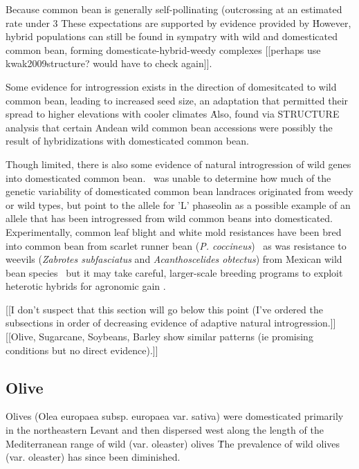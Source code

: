 \documentclass[11pt]{article}
\begin{document}
Because common bean is generally self-pollinating (outcrossing at an estimated rate under 3%
These expectations are supported by evidence provided by \cite{papa2003asymmetry}\.
However, hybrid populations can still be found in sympatry with wild and domesticated common bean, forming domesticate-hybrid-weedy complexes [[perhaps use kwak2009structure?  would have to check again]].

Some evidence for introgression exists in the direction of domesitcated to wild common bean, leading to increased seed size, an adaptation that permitted their spread to higher elevations with cooler climates \cite{debouck1993genetic}\.
Also, \cite{kwak2009structure} found via STRUCTURE analysis that certain Andean wild common bean accessions were possibly the result of hybridizations with domesticated common bean.

Though limited, there is also some evidence of natural introgression of wild genes into domesticated common bean.
\cite{papa2003asymmetry}\ was unable to determine how much of the genetic variability of domesticated common bean landraces originated from weedy or wild types, but point to the allele for 'L' phaseolin as a possible example of an allele that has been introgressed from wild common beans into domesticated.
Experimentally, common leaf blight and white mold resistances have been bred into common bean from scarlet runner bean (\emph{P. coccineus}) \cite{park1987transfer, schwartz2006inheritance}\, as was resistance to weevils (\emph{Zabrotes subfasciatus} and \emph{Acanthoscelides obtectus}) from Mexican wild bean species \cite{kornegay1991inheritance}\, but it may take careful, larger-scale breeding programs to exploit heterotic hybrids for agronomic gain \cite{paredes1995extensive}.





[[I don't suspect that this section will go below this point (I've ordered the subsections in order of decreasing evidence of adaptive natural introgression.]]
[[Olive, Sugarcane, Soybeans, Barley show similar patterns (ie promising conditions but no direct evidence).]]

\subsection*{Olive}

Olives (Olea europaea subsp. europaea var. sativa) were domesticated primarily in the northeastern Levant and then dispersed west along the length of the Mediterranean range of wild (var. oleaster) olives \cite{besnard2013complex}\.
The prevalence of wild olives (var. oleaster) has since been diminished.
\end{document}
